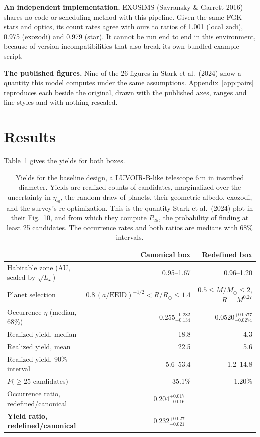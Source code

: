 \documentclass[11pt,a4paper]{article}
\begin{document}
\textbf{An independent implementation.} EXOSIMS (Savransky \& Garrett 2016) shares no code or
scheduling method with this pipeline. Given the same FGK stars and optics, its count rates agree
with ours to ratios of 1.001 (local zodi), 0.975 (exozodi) and 0.979 (star). It cannot be run end
to end in this environment, because of version incompatibilities that also break its own bundled
example script.

\textbf{The published figures.} Nine of the 26 figures in Stark et al.\ (2024) show a quantity
this model computes under the same assumptions. Appendix~\ref{app:pairs} reproduces each beside the
original, drawn with the published axes, ranges and line styles and with nothing rescaled.

\section{Results}
\label{sec:results}

Table~\ref{tab:answer} gives the yields for both boxes.

\begin{table}[htbp]
\centering
\small
\begin{tabular}{lrr}
\toprule
& \textbf{Canonical box} & \textbf{Redefined box} \\
\midrule
Habitable zone (AU, scaled by $\sqrt{L_\star}$) & 0.95--1.67 & 0.96--1.20 \\
Planet selection & $0.8\,(a/\mathrm{EEID})^{-1/2} < R/R_\oplus \le 1.4$ & $0.5 \le M/M_\oplus \le 2$, $R=M^{0.27}$ \\
Occurrence $\eta$ (median, 68\%) & $0.255^{+0.282}_{-0.134}$ & $0.0520^{+0.0577}_{-0.0274}$ \\
Realized yield, median & 18.8 & 4.3 \\
Realized yield, mean & 22.5 & 5.6 \\
Realized yield, 90\% interval & 5.6--53.4 & 1.2--14.8 \\
$P(\ge 25$ candidates$)$ & 35.1\% & 1.20\% \\
\midrule
Occurrence ratio, redefined/canonical & \multicolumn{2}{c}{$0.204^{+0.017}_{-0.016}$} \\
\textbf{Yield ratio, redefined/canonical} & \multicolumn{2}{c}{$\mathbf{0.232^{+0.027}_{-0.021}}$} \\
\bottomrule
\end{tabular}
\caption{Yields for the baseline design, a LUVOIR-B-like telescope 6\,m in inscribed diameter.
Yields are realized counts of candidates, marginalized over the uncertainty in $\eta_\oplus$, the
random draw of planets, their geometric albedo, exozodi, and the survey's re-optimization. This is
the quantity Stark et al.\ (2024) plot in their Fig.~10, and from which they compute $P_{25}$, the
probability of finding at least 25 candidates. The occurrence rates and both ratios are medians
with 68\% intervals.}
\label{tab:answer}
\end{table}
\end{document}
